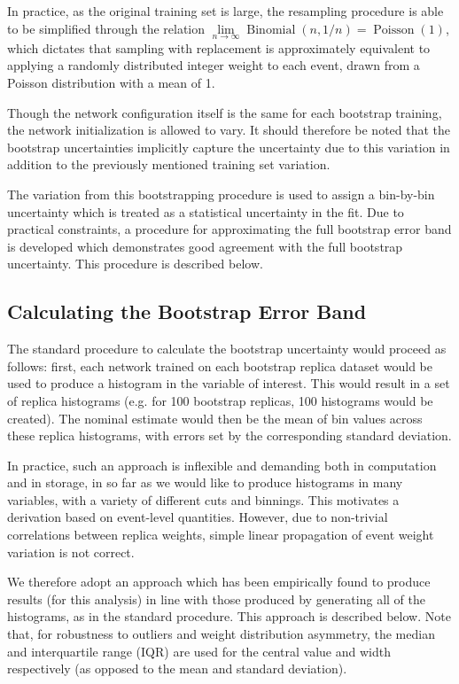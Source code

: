 In practice, as the original training set is large, the resampling procedure is
able to be simplified through the relation $\lim\limits_{n\rightarrow \infty}
	\operatorname{Binomial}(n, 1/n) = \operatorname{Poisson}(1)$, which dictates that sampling
with replacement is approximately equivalent to applying a randomly distributed
integer weight to each event, drawn from a Poisson distribution with a mean of
1.

Though the network configuration itself is the same for each bootstrap training, the
network initialization is allowed to vary. It should therefore be noted that the bootstrap
uncertainties implicitly capture the uncertainty due to this variation in addition to
the previously mentioned training set variation.

The variation from this bootstrapping procedure is used to assign a bin-by-bin uncertainty
which is treated as a statistical uncertainty in the fit. Due to practical constraints,
a procedure for approximating the full bootstrap error band is developed which demonstrates
good agreement with the full bootstrap uncertainty. This procedure is described below.

\subsection{Calculating the Bootstrap Error Band}
The standard procedure to calculate the bootstrap uncertainty would proceed as 
follows: first, each network trained on each bootstrap replica dataset would be used
to produce a histogram in the variable of interest. This would result in a set of 
replica histograms (e.g. for 100 bootstrap replicas, 100 histograms would be created). 
The nominal estimate would then be the mean of bin values across these replica histograms, 
with errors set by the corresponding standard deviation.

In practice, such an approach is inflexible and demanding both in computation and 
in storage, in so far as we would like to produce histograms in many variables, with a 
variety of different cuts and binnings. This motivates a derivation based on event-level 
quantities. However, due to non-trivial correlations between replica weights, simple linear 
propagation of event weight variation is not correct.

We therefore adopt an approach which has been empirically found to produce results (for this
analysis) in line with those produced by generating all of the histograms, as in the standard 
procedure. This approach is described below. Note that, for robustness to outliers and weight distribution 
asymmetry, the median and interquartile range (IQR) are used for the central value and width 
respectively (as opposed to the mean and standard deviation).

